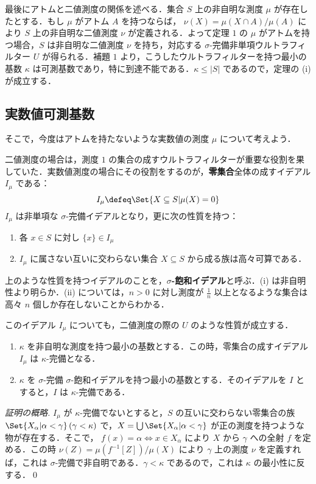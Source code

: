 \documentclass[a4j]{ltjsarticle}
\begin{document}
最後にアトムと二値測度の関係を述べる．集合 $S$ 上の非自明な測度 $\mu$ が存在したとする．もし $\mu$ がアトム $A$ を持つならば， $\nu(X) = \mu(X \cap A)/\mu(A)$ により $S$ 上の非自明な二値測度 $\nu$ が定義される．よって定理 $1$ の $\mu$ がアトムを持つ場合，$S$ は非自明な二値測度 $\nu$ を持ち，対応する $\sigma$-完備非単項ウルトラフィルター $U$ が得られる．補題 $1$ より，こうしたウルトラフィルターを持つ最小の基数 $\kappa$ は可測基数であり，特に到達不能である．$\kappa \leq |S|$ であるので，定理の (i) が成立する．

\subsection{実数値可測基数}
そこで，今度はアトムを持たないような実数値の測度 $\mu$ について考えよう．

二値測度の場合は，測度 $1$ の集合の成すウルトラフィルターが重要な役割を果していた．実数値測度の場合にその役割をするのが，{\bfseries 零集合}全体の成すイデアル $I_\mu$ である：
\[
 I_\mu \defeq \Set{X \subseteq S | \mu(X) = 0}
\]
$I_\mu$ は非単項な $\sigma$-完備イデアルとなり，更に次の性質を持つ：

\begin{enumerate}[label=(\roman*)]
 \item 各 $x \in S$ に対し $\{x\} \in I_\mu$
       \label{Def:saturate:non-principal}
 \item $I_\mu$ に属さない互いに交わらない集合 $X \subseteq S$ から成る族は高々可算である．
       \label{Def:saturate:disj}
\end{enumerate}

上のような性質を持つイデアルのことを，{\bfseries $\sigma$-飽和イデアル}と呼ぶ．(i) は非自明性より明らか．(ii) については，$n > 0$ に対し測度が $\frac{1}{n}$ 以上となるような集合は高々 $n$ 個しか存在しないことからわかる．

このイデアル $I_\mu$ についても，二値測度の際の $U$ のような性質が成立する．

\begin{lemma}
 \begin{enumerate}[label=(\roman*)]
  \item $\kappa$ を非自明な測度を持つ最小の基数とする．この時，零集合の成すイデアル $I_\mu$ は $\kappa$-完備となる．
  \item $\kappa$ を $\sigma$-完備 $\sigma$-飽和イデアルを持つ最小の基数とする．そのイデアルを $I$ とすると，$I$ は $\kappa$-完備である．
 \end{enumerate}
\end{lemma}
\begin{proof}[証明の概略]
 $I_\mu$ が $\kappa$-完備でないとすると，$S$ の互いに交わらない零集合の族 $\Set{X_\alpha | \alpha < \gamma}\,(\gamma < \kappa)$ で，$X = \bigcup \Set{X_\alpha | \alpha < \gamma}$ が正の測度を持つような物が存在する．そこで，
 $f(x) = \alpha \Leftrightarrow x \in X_\alpha$
 により $X$ から $\gamma$ への全射 $f$ を定める．この時 $\nu(Z) = \mu(f^{-1}[Z])/\mu(X)$ により $\gamma$ 上の測度 $\nu$ を定義すれば，これは $\sigma$-完備で非自明である．$\gamma < \kappa$ であるので，これは $\kappa$ の最小性に反する．\qed
\end{proof}
\end{document}
